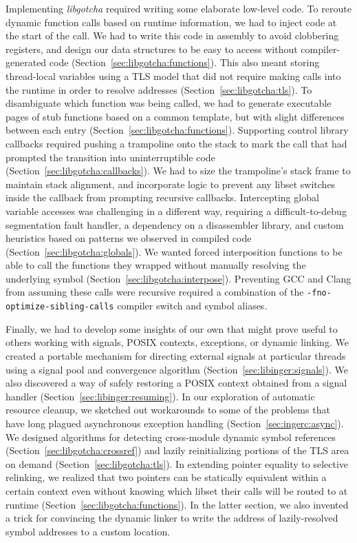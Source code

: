 Implementing \textit{libgotcha} required writing some elaborate low-level code.  To
reroute dynamic function calls based on runtime information, we had to inject code
at the start of the call.  We had to write this code in assembly to avoid clobbering
registers, and design our data structures to be easy to access without
compiler-generated code (Section~\ref{sec:libgotcha:functions}).  This also meant
storing thread-local variables using a TLS model that did not require making calls
into the runtime in order to resolve addresses (Section~\ref{sec:libgotcha:tls}).  To
disambiguate which function was being called, we had to generate executable pages of
stub functions based on a common template, but with slight differences between each
entry (Section~\ref{sec:libgotcha:functions}).  Supporting control library callbacks
required pushing a trampoline onto the stack to mark the call that had prompted the
transition into uninterruptible code  (Section~\ref{sec:libgotcha:callbacks}).  We
had to size the trampoline's stack frame to maintain stack alignment, and incorporate
logic to prevent any libset switches inside the callback from prompting recursive
callbacks.  Intercepting global variable accesses was challenging in a different way,
requiring a difficult-to-debug segmentation fault handler, a dependency on a
disassembler library, and custom heuristics based on patterns we observed in compiled
code (Section~\ref{sec:libgotcha:globals}).  We wanted forced interposition functions
to be able to call the functions they wrapped without manually resolving the
underlying symbol (Section~\ref{sec:libgotcha:interpose}).  Preventing GCC and Clang
from assuming these calls were recursive required a combination of the
\texttt{-fno-optimize-sibling-calls} compiler switch and symbol aliases.

Finally, we had to develop some insights of our own that might prove useful to others
working with signals, POSIX contexts, exceptions, or dynamic linking.  We created a
portable mechanism for directing external signals at particular threads using a
signal pool and convergence algorithm (Section~\ref{sec:libinger:signals}).  We also
discovered a way of safely restoring a POSIX context obtained from a signal handler
(Section~\ref{sec:libinger:resuming}).  In our exploration of automatic resource
cleanup, we sketched out workarounds to some of the problems that have long plagued
asynchronous exception handling (Section~\ref{sec:ingerc:async}).  We designed
algorithms for detecting cross-module dynamic symbol references
(Section~\ref{sec:libgotcha:crossref}) and lazily reinitializing portions of the TLS
area on demand (Section~\ref{sec:libgotcha:tls}).  In extending pointer equality
to selective relinking, we realized that two pointers can be statically equivalent
within a certain context even without knowing which libset their calls will be routed
to at runtime (Section~\ref{sec:libgotcha:functions}).  In the latter section, we
also invented a trick for convincing the dynamic linker to write the address of
lazily-resolved symbol addresses to a custom location.


